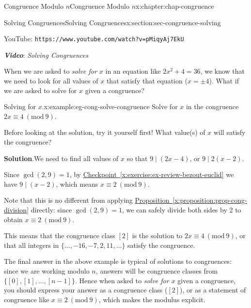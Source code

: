 \documentclass[oneside,10pt,]{book}
\newcommand{\blocktitlefont}{\relax}
\newcommand{\xreffont}{\relax}
\newcommand{\mono}[1]{\texttt{#1}}
\newcommand{\alert}[1]{\textbf{\textit{#1}}}
\numberwithin{equation}{section}
\newlength{\qrsize}
\newlength{\previewwidth}
\newcommand{\Mod}[1]{\ \left(\mathrm{mod}\ #1\right)}
\begin{document}
\begin{chapterptx}{Congruence Modulo \(n\)}{}{Congruence Modulo \(n\)}{}{}{x:chapter:chap-congruence}
\begin{sectionptx}{Solving Congruences}{}{Solving Congruences}{}{}{x:section:sec-congruence-solving}
\begin{sidebyside}{1}{0}{0}{0}
\begin{sbspanel}{1}
\begin{tcbraster}[raster columns=2, raster column skip=1pt, raster halign=center, raster force size=false, raster left skip=0pt, raster right skip=0pt]
\begin{tcolorbox}[previewstyle, width=\previewwidth]
\end{tcolorbox}%
\begin{tcolorbox}[qrstyle]%
{\hypersetup{urlcolor=black}}%
\end{tcolorbox}%
\begin{tcolorbox}[captionstyle]%
\small YouTube: \mono{https://www.youtube.com/watch?v=pMiqyAj7EkU}\end{tcolorbox}%
\end{tcbraster}%
\end{sbspanel}%
\end{sidebyside}%
\par
\alert{Video}: \emph{Solving Congruences}%
\par
When we are asked to \emph{solve for \(x\)} in an equation like \(2x^2 + 4 = 36\), we know that we need to look for all values of \(x\) that satisfy that equation (\(x = \pm 4\)). What if we are asked to solve for \(x\) given a congruence?%
\begin{example}{Solving for \(x\).}{x:example:eg-cong-solve-congruence}%
Solve for \(x\) in the congruence \(2x \equiv 4 \Mod{9}\).%
\par
Before looking at the solution, try it yourself first! What value(s) of \(x\) will satisfy the congruence?%
\par\smallskip%
\noindent\textbf{\blocktitlefont Solution}.\hypertarget{g:solution:id535908}{}\quad{}We need to find all values of \(x\) so that \(9 \mid (2x - 4)\), or \(9 \mid 2(x-2)\).%
\par
Since \(\gcd(2,9) = 1\), by \hyperref[x:exercise:ex-review-bezout-euclid]{Checkpoint~{\xreffont\ref{x:exercise:ex-review-bezout-euclid}}} we have \(9 \mid (x-2)\), which means \(x \equiv 2 \Mod{9}\).%
\par
Note that this is no different from applying \hyperref[x:proposition:prop-cong-division]{Proposition~{\xreffont\ref{x:proposition:prop-cong-division}}} directly: since \(\gcd(2,9) = 1\), we can safely divide both sides by 2 to obtain \(x \equiv 2 \Mod{9}\).%
\par
This means that the congruence class \([2]\) is the solution to \(2x \equiv 4 \Mod{9}\), or that all integers in \(\{\ldots,-16,-7,2,11,\ldots\}\) satisfy the congruence.%
\end{example}
The final answer in the above example is typical of solutions to congruences: since we are working modulo \(n\), answers will be congruence classes from \(\{[0],[1],\ldots,[n-1]\}\). Hence when asked to \emph{solve for \(x\)} given a congruence, you should express your answer as a congruence class (\([2]\)), or as a statement of congruence like \(x \equiv 2 \Mod{9}\), which makes the modulus explicit.%

\end{sectionptx}
\end{chapterptx}
\end{document}

